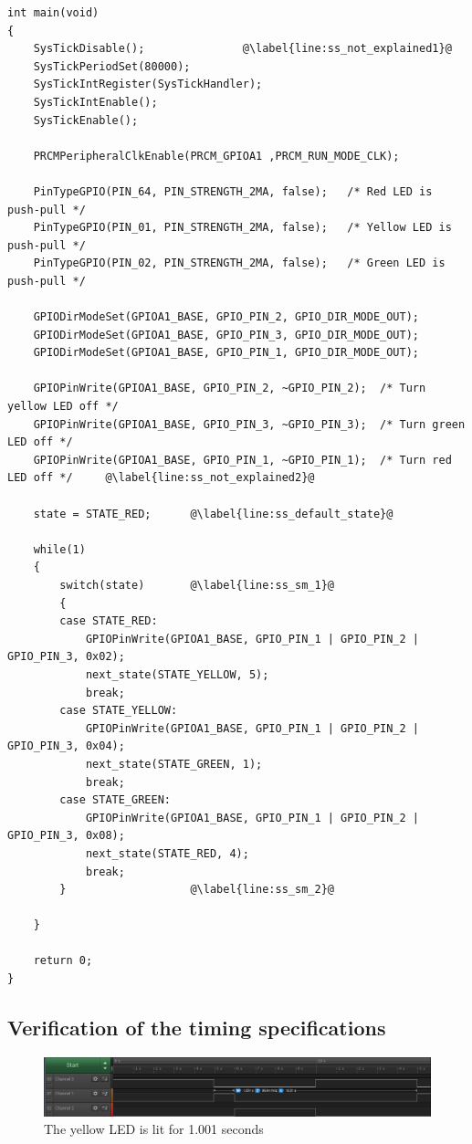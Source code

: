 \begin{lstlisting}[style=CStyle, caption={Second part of the static scheduler}, captionpos=b, label={lst:static_scheduler_2}, escapechar=@]
int main(void)
{
    SysTickDisable();               @\label{line:ss_not_explained1}@
    SysTickPeriodSet(80000);
    SysTickIntRegister(SysTickHandler);
    SysTickIntEnable();
    SysTickEnable();

    PRCMPeripheralClkEnable(PRCM_GPIOA1 ,PRCM_RUN_MODE_CLK);

    PinTypeGPIO(PIN_64, PIN_STRENGTH_2MA, false);   /* Red LED is push-pull */
    PinTypeGPIO(PIN_01, PIN_STRENGTH_2MA, false);   /* Yellow LED is push-pull */
    PinTypeGPIO(PIN_02, PIN_STRENGTH_2MA, false);   /* Green LED is push-pull */

    GPIODirModeSet(GPIOA1_BASE, GPIO_PIN_2, GPIO_DIR_MODE_OUT);
    GPIODirModeSet(GPIOA1_BASE, GPIO_PIN_3, GPIO_DIR_MODE_OUT);
    GPIODirModeSet(GPIOA1_BASE, GPIO_PIN_1, GPIO_DIR_MODE_OUT);

    GPIOPinWrite(GPIOA1_BASE, GPIO_PIN_2, ~GPIO_PIN_2);  /* Turn yellow LED off */
    GPIOPinWrite(GPIOA1_BASE, GPIO_PIN_3, ~GPIO_PIN_3);  /* Turn green LED off */
    GPIOPinWrite(GPIOA1_BASE, GPIO_PIN_1, ~GPIO_PIN_1);  /* Turn red LED off */     @\label{line:ss_not_explained2}@

    state = STATE_RED;      @\label{line:ss_default_state}@

    while(1)
    {
        switch(state)       @\label{line:ss_sm_1}@
        {
        case STATE_RED:
            GPIOPinWrite(GPIOA1_BASE, GPIO_PIN_1 | GPIO_PIN_2 | GPIO_PIN_3, 0x02);
            next_state(STATE_YELLOW, 5);
            break;
        case STATE_YELLOW:
            GPIOPinWrite(GPIOA1_BASE, GPIO_PIN_1 | GPIO_PIN_2 | GPIO_PIN_3, 0x04);
            next_state(STATE_GREEN, 1);
            break;
        case STATE_GREEN:
            GPIOPinWrite(GPIOA1_BASE, GPIO_PIN_1 | GPIO_PIN_2 | GPIO_PIN_3, 0x08);
            next_state(STATE_RED, 4);
            break;
        }                   @\label{line:ss_sm_2}@

    }

    return 0;
}
\end{lstlisting}

\newpage
\subsection{Verification of the timing specifications}


\begin{figure}[H]
    \centering

    \includegraphics[scale=0.43]{img/yellow.png}

    \caption{The yellow LED is lit for 1.001 seconds}
    \label{fig:yellow}

\end{figure}

